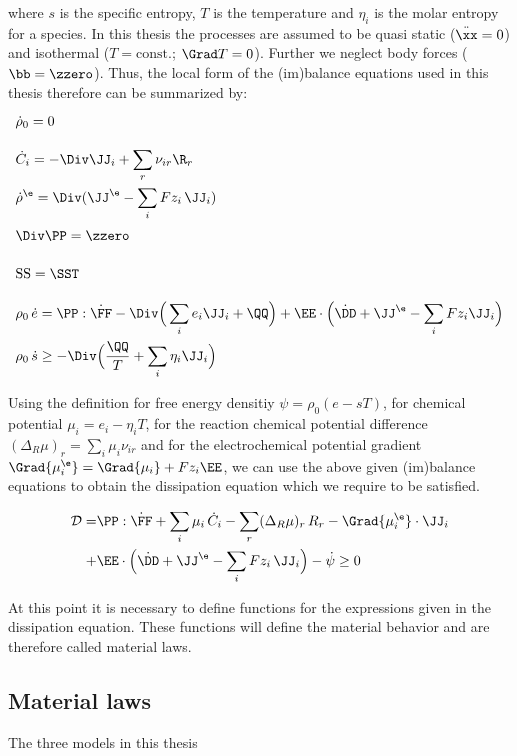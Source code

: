 where $s$ is the specific entropy, $T$ is the temperature and $\eta_i$ is the molar entropy for a species. In this thesis the processes are assumed to be quasi static ($\ddot\xx=0$) and isothermal ($T=\text{const.}$; $\Grad T = 0$). Further we neglect body forces ($\bb=\zzero$). Thus, the local form of the (im)balance equations used in this thesis therefore can be summarized by:
\begin{align}
  \vphantom{\sum_i}& \dot\rho_0 = 0 \\
  \vphantom{\sum_i}& \dot C_i = -\Div\JJ_i + \sum_r \nu_{ir} \R_r \\
  \vphantom{\sum_i}& \dot \rho^{\e} = \Div(\JJ^\e - \sum_i Fz_i\, \JJ_i) \\
  \vphantom{\sum_i}& \Div\PP = \zzero \\
  \vphantom{\sum_i}& \SS = \SST \\
  \vphantom{\sum_i}& \rho_0\,\dot e = \PP:\dot\FF - \Div\Big(\sum_i e_i \JJ_i+ \QQ \Big)+ \EE\cdot\Big(\dot \DD+\JJ^\e-\sum_i Fz_i\JJ_i\Big) \\
  \vphantom{\sum_i}& \rho_0\,\dot s \geq -\Div\Big(\frac{\QQ}{T}+\sum_i \eta_i \JJ_i \Big)
\end{align}

Using the definition for free energy densitiy $\psi=\rho_0(e-sT)$, for chemical potential $\mu_i=e_i-\eta_iT$, for the reaction chemical potential difference $(\Delta_R\mu)_r=\sum_i \mu_i\nu_{ir}$ and for the electrochemical potential gradient $\Grad{\mu^\e_i}=\Grad{\mu_i} + Fz_i\EE$, we can use the above given (im)balance equations to obtain the dissipation equation which we require to be satisfied. 

\begin{align}
  \begin{aligned}
    \mathcal{D} = &\PP:\dot\FF + \sum_i \mu_i\,\dot C_i - \sum_r (\Delta_R\mu)_r \,R_r - \Grad{\mu_i^\e}\cdot\JJ_i  \\
                + &\EE\cdot\Big(\dot\DD+\JJ^\e-\sum_i Fz_i\,\JJ_i\Big)- \dot\psi\geq 0
  \end{aligned}
  \label{eq:dissipation}
\end{align}

At this point it is necessary to define functions for the expressions given in the dissipation equation. These functions will define the material behavior and are therefore called material laws. 

\subsection{Material laws}
The three models in this thesis 

